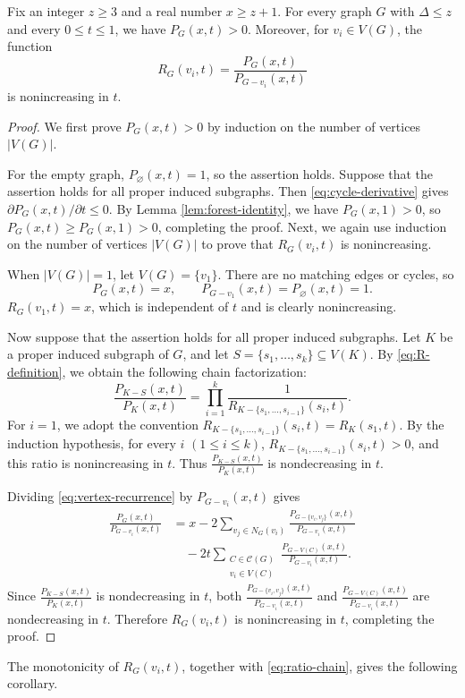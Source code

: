\documentclass[11pt, a4paper]{article}
\begin{document}
\begin{lemma}\label{lem:monotonicity}
Fix an integer $z\geq3$ and a real number $x\geq z+1$.
For every graph $G$ with $\Delta \leq z$ and every $0\leq t\leq1$, we have $P_G(x,t)>0$.
Moreover, for $v_i\in V(G)$, the function
\begin{equation}\label{eq:R-definition}
 R_G(v_i,t)=\frac{P_G(x,t)}{P_{G-v_i}(x,t)}
\end{equation}
is nonincreasing in $t$.
\end{lemma}

\begin{proof}
We first prove $P_G(x,t)>0$ by induction on the number of vertices $|V(G)|$.

For the empty graph, $P_\varnothing(x,t)=1$, so the assertion holds.
Suppose that the assertion holds for all proper induced subgraphs.
Then \eqref{eq:cycle-derivative} gives $\partial P_G(x,t)/\partial t\leq0$.
By Lemma \ref{lem:forest-identity}, we have $P_G(x,1)>0$,
so $P_G(x,t)\geq P_G(x,1)>0$, completing the proof.
Next, we again use induction on the number of vertices $|V(G)|$ to prove that $R_G(v_i,t)$ is nonincreasing.

When $|V(G)|=1$, let $V(G)=\{v_1\}$. There are no matching edges or cycles, so
\[
P_G(x,t)=x, \qquad P_{G-v_1}(x,t)=P_\varnothing(x,t)=1.
\]
$R_G(v_1,t)=x$,
which is independent of $t$ and is clearly nonincreasing.

Now suppose that the assertion holds for all proper induced subgraphs.
Let $K$ be a proper induced subgraph of $G$, and let $S=\{s_1,\ldots,s_k\}\subseteq V(K)$.
By \eqref{eq:R-definition}, we obtain the following chain factorization:
\begin{equation}\label{eq:ratio-chain}
 \frac{P_{K-S}(x,t)}{P_K(x,t)}
 =\prod_{i=1}^{k}
 \frac{1}{R_{K-\{s_1,\ldots,s_{i-1}\}}(s_i,t)}.
\end{equation}
For $i=1$, we adopt the convention
$R_{K-\{s_1,\ldots,s_{i-1}\}}(s_i,t)=R_K(s_1,t)$.
By the induction hypothesis, for every $i$ $(1\leq i \leq k)$,
$R_{K-\{s_1,\ldots,s_{i-1}\}}(s_i,t)>0$, and this ratio is nonincreasing in $t$.
Thus $\frac{P_{K-S}(x,t)}{P_K(x,t)}$ is nondecreasing in $t$.

Dividing \eqref{eq:vertex-recurrence} by $P_{G-v_i}(x,t)$ gives
\begin{equation}\label{eq:6}
\begin{split}
\frac{P_G(x,t)}{P_{G-v_i}(x,t)} &= x - 2 \sum_{v_j \in N_G(v_i)} \frac{P_{G-\{v_i,v_j\}}(x,t)}{P_{G-v_i}(x,t)} \\
&\quad - 2t \sum_{\substack{C \in \mathcal{C}(G) \\ v_i \in V(C)}} \frac{P_{G-V(C)}(x,t)}{P_{G-v_i}(x,t)}.
\end{split}
\end{equation}
Since $\frac{P_{K-S}(x,t)}{P_K(x,t)}$ is nondecreasing in $t$,
both $\frac{P_{G-\{v_i,v_j\}}(x,t)}{P_{G-v_i}(x,t)}$ 
and $\frac{P_{G-V(C)}(x,t)}{P_{G-v_i}(x,t)}$ are nondecreasing in $t$.
Therefore $R_G(v_i,t)$ is nonincreasing in $t$, completing the proof.
\end{proof}
The monotonicity of $R_G(v_i,t)$, together with \eqref{eq:ratio-chain}, gives the following corollary.
\end{document}

